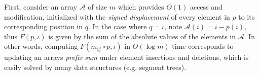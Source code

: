 \documentclass[sn-mathphys]{sn-jnl}
\begin{document}
%
First, consider an array $\mathcal{A}$ of size $m$ which provides $O(1)$ access and modification, initialized with the \emph{signed displacement} of every element in $p$ to its corresponding position in $q$. 
In the case where $q = \iota$, note $\mathcal{A}(i) = i - p(i)$, thus $F(p, \iota)$ is given by the sum of the absolute values of the elements in $\mathcal{A}$.
In other words, computing $F(m_{ij} \circ p, \iota)$ in $O(\log m)$ time corresponds to updating an arrays \emph{prefix sum} under element insertions and deletions, which is easily solved by many data structures (e.g. segment trees).
\end{document}
